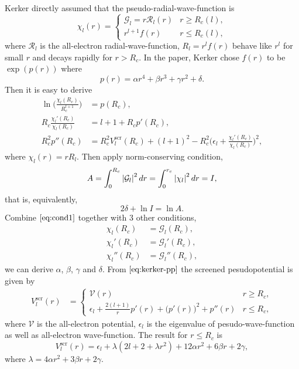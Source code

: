Kerker directly assumed that the pseudo-radial-wave-function is
\begin{equation}
	\chi_l (r) =
	\begin{cases}
		\mathcal{G}_l = r \mathcal{R}_l (r) & r \geq R_c (l), \\
		r^{l+1} f(r)                        & r \leq R_c (l),
	\end{cases}
\end{equation}
where $\mathcal{R}_l$ is the all-electron radial-wave-function,
$R_l = r^l f(r)$ behave like $r^l$ for small $r$ and decays rapidly for $r > R_c$.
In the paper, Kerker chose $f(r)$ to be $\exp( p(r) )$ where
\begin{equation}
	p(r) =  \alpha r^4 + \beta r^3 + \gamma r^2 + \delta.
\end{equation}
Then it is easy to derive
\begin{align}
	\ln \bigg( \frac{ \chi_l(R_c) }{ R_c^{l+1} } \bigg)
	  & = p(R_c), \label{eq:kerker0}                                              \\
	R_c \frac{ \chi_l'(R_c) }{ \chi_l(R_c) }
	  & = l + 1 + R_c p'(R_c), \label{eq:kerker1}                                     \\
	R_c^2 p''(R_c)
	  & = R_c^2 V_l^\text{scr} (R_c) + (l + 1)^2 - R_c^2 \bigg(
	\epsilon_l + \frac{ \chi_l'(R_c) }{ \chi_l(R_c) }
	\bigg)^2, \label{eq:kerker-pp}
\end{align}
where $\chi_l (r) = r R_l$. Then apply norm-conserving condition,
\begin{equation}
	A = \int_{0}^{R_c} \abs{\mathcal{G}_l}^2 \, dr = \int_{0}^{r_c} \abs{\chi_l}^2 \, dr = I,
\end{equation}
that is, equivalently,
\begin{equation}\label{eq:cond1}
	2\delta + \ln I = \ln A.
\end{equation}
Combine $\eqref{eq:cond1}$ together with $3$ other conditions,
\begin{align}
	\chi_l (R_c)   & = \mathcal{G}_l (R_c),   \\
	\chi_l' (R_c)  & = \mathcal{G}_l' (R_c),  \\
	\chi_l'' (R_c) & = \mathcal{G}_l'' (R_c),
\end{align}
we can derive $\alpha$, $\beta$, $\gamma$ and $\delta$.
From $\eqref{eq:kerker-pp}$ the screened pesudopotential is given by
\begin{align}
	V_l^\text{scr} (r) & =
	\begin{cases}
		\mathcal{V} (r)                    & r \geq R_c, \\
		\epsilon_l + \frac{ 2(l+1) }{ r } p'(r)
    + \big(p'(r) \big)^2 + p''(r) & r \leq R_c,
	\end{cases}
\end{align}
where $\mathcal{V}$ is the all-electron potential, $\epsilon_l$ is the
eigenvalue of pesudo-wave-function as well as all-electron wave-function.
The result for $r \le R_c$ is
\begin{equation}
	V_l^\text{scr} (r) = \epsilon_l + \lambda (2 l + 2 + \lambda r^2) + 12 \alpha r^2 + 6 \beta r + 2 \gamma,
\end{equation}
where $\lambda = 4 \alpha r^2 + 3 \beta r + 2 \gamma$.

